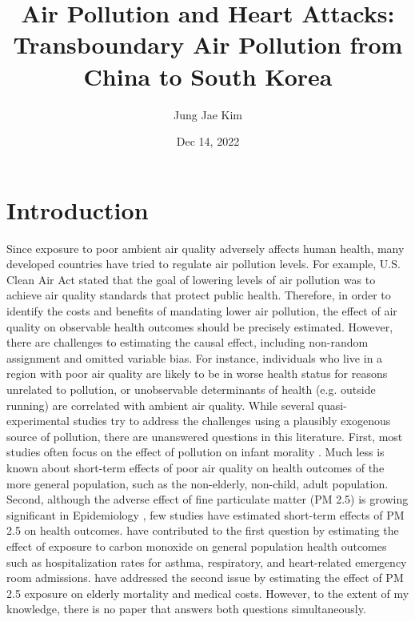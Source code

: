 \documentclass{article}
\title{Air Pollution and Heart Attacks: Transboundary Air Pollution from China to South Korea}
\author {Jung Jae Kim}
\date{Dec 14, 2022}
\begin{document}
\maketitle


\section{Introduction}
Since exposure to poor ambient air quality adversely affects human health, many developed countries have tried to regulate air pollution levels. For example, U.S. Clean Air Act stated that the goal of lowering levels of air pollution was to achieve air quality standards that protect public health. Therefore, in order to identify the costs and benefits of mandating lower air pollution, the effect of air quality on observable health outcomes should be precisely estimated. However, there are challenges to estimating the causal effect, including non-random assignment and omitted variable bias. For instance, individuals who live in a region with poor air quality are likely to be in worse health status for reasons unrelated to pollution, or unobservable determinants of health (e.g. outside running) are correlated with ambient air quality. While several quasi-experimental studies try to address the challenges using a plausibly exogenous source of pollution, there are unanswered questions in this literature. First, most studies often focus on the effect of pollution on infant morality \parencite{chay2003impact,currie2005air,currie2009air}. Much less is known about short-term effects of poor air quality on health outcomes of the more general population, such as the non-elderly, non-child, adult population. Second, although the adverse effect of fine particulate matter (PM 2.5) is growing significant in Epidemiology \parencite{cox2017socioeconomic}, few studies have estimated short-term effects of PM 2.5 on health outcomes. \textcite{schlenker2016airports} have contributed to the first question by estimating the effect of exposure to carbon monoxide on general population health outcomes such as hospitalization rates for asthma, respiratory, and heart-related emergency room admissions. \textcite{deryugina2019mortality} have addressed the second issue by estimating the effect of PM 2.5 exposure on elderly mortality and medical costs. However, to the extent of my knowledge, there is no paper that answers both questions simultaneously.
\end{document}
